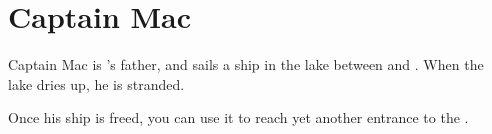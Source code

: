 \section{Captain Mac}
\label{char:mac}


Captain Mac is 's father, and sails a ship in the lake between  and . When the lake dries up, he is stranded.

Once his ship is freed, you can use it to reach yet another entrance to the .
